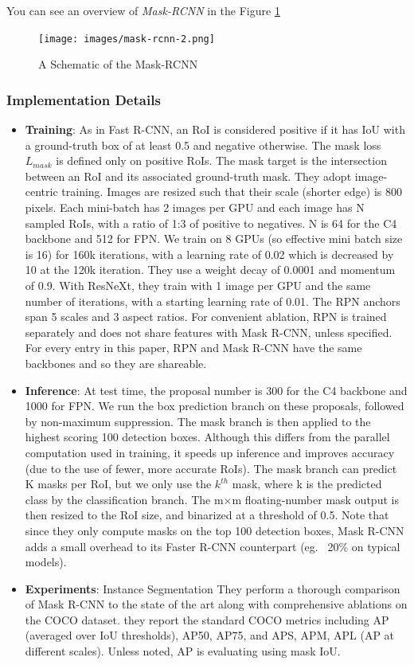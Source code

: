 \documentclass[a4paper, openany]{book}
\begin{document}
You can see an overview of \textit{Mask-RCNN} in the Figure \ref{fig:mask-rcnn-2}

\begin{figure}[ht]
  \centering
    \texttt{[image: images/mask-rcnn-2.png]}
      \caption{A Schematic of the Mask-RCNN}
  \label{fig:mask-rcnn-2}
\end{figure}


\subsubsection{Implementation Details}
	\vspace{0.3cm}
	
\begin{itemize}
\item \textbf{Training}: As in Fast R-CNN, an RoI is considered positive if it has IoU with a ground-truth box of at least 0.5 and negative otherwise. The mask loss $L_{mask}$ is defined only on positive RoIs. The mask target is the intersection between an RoI and its associated ground-truth mask. They adopt image-centric training. Images are resized such that their scale (shorter edge) is 800 pixels. Each mini-batch has 2 images per GPU and each image has N sampled RoIs, with a ratio of 1:3 of positive to negatives. N is 64 for the C4 backbone and 512 for FPN. We train on 8 GPUs (so effective mini batch size is 16) for 160k iterations, with a learning rate of 0.02 which is decreased by 10 at the 120k iteration. They use a weight decay of 0.0001 and momentum of 0.9. With ResNeXt, they train with 1 image per GPU and the same number of iterations, with a starting learning rate of 0.01. The RPN anchors span 5 scales and 3 aspect ratios. For convenient ablation, RPN is trained separately and does not share features with Mask R-CNN, unless specified. For every entry in this paper, RPN and Mask R-CNN have the same backbones and so they are shareable.
\item \textbf{Inference}: At test time, the proposal number is 300 for the C4 backbone and 1000 for FPN. We run the box prediction branch on these proposals, followed by non-maximum suppression. The mask branch is then applied to the highest scoring 100 detection boxes. Although this differs from the parallel computation used in training, it speeds up inference and improves accuracy (due to the use of fewer, more accurate RoIs). The mask branch can predict K masks per RoI, but we only use the $k^{th}$ mask, where k is the predicted class by the classification branch. The m×m floating-number mask output is then resized to the RoI size, and binarized at a threshold of 0.5. Note that since they only compute masks on the top 100 detection boxes, Mask R-CNN adds a small overhead to its Faster R-CNN counterpart (eg. ~20\% on typical models).

\item \textbf{Experiments}: Instance Segmentation They perform a thorough comparison of Mask R-CNN to the state of the art along with comprehensive ablations on the COCO dataset. they report the standard COCO metrics including AP (averaged over IoU thresholds), AP50, AP75, and APS, APM, APL (AP at different scales). Unless noted, AP is evaluating using mask IoU. 
\end{itemize}
	
\end{document}
